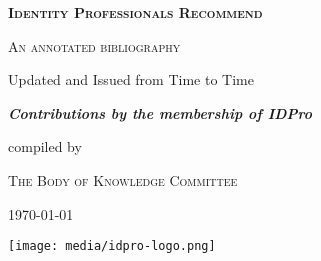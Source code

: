 \begin{titlepage}
	\centering
	{\scshape\huge\bfseries  Identity Professionals Recommend \par}
	\vspace{1cm}
	{\scshape\LARGE An annotated bibliography\par}
	\vspace{1.5cm}
	{\large Updated and Issued from Time to Time\par}
	\vspace{2cm}
	{\Large\itshape\bfseries Contributions by the membership of IDPro\par}
	\vfill
	compiled by\par
	\textsc{The Body of Knowledge Committee}
	\vfill
	{\large \today\par}
	\vfill
	\texttt{[image: media/idpro-logo.png]}\par\vspace{1cm}
	\clearpage
\end{titlepage}